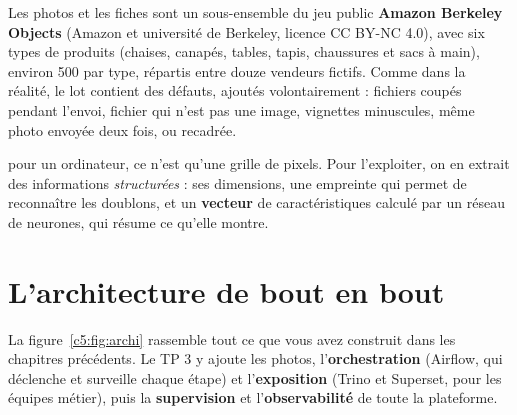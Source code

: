 Les photos et les fiches sont un sous-ensemble du jeu public \textbf{Amazon Berkeley Objects}
(Amazon et université de Berkeley, licence CC BY-NC 4.0), avec six types de produits (chaises,
canapés, tables, tapis, chaussures et sacs à main), environ 500 par type, répartis entre douze
vendeurs fictifs. Comme dans la
réalité, le lot contient des défauts, ajoutés volontairement : fichiers coupés pendant l'envoi,
fichier qui n'est pas une image, vignettes minuscules, même photo envoyée deux fois, ou recadrée.

\begin{notion}
pour un ordinateur, ce n'est qu'une grille de
pixels. Pour l'exploiter, on en extrait des informations \emph{structurées} : ses dimensions, une
empreinte qui permet de reconnaître les doublons, et un \textbf{vecteur} de caractéristiques
calculé par un réseau de neurones, qui résume ce qu'elle montre.
\end{notion}

\section{L'architecture de bout en bout}

La figure~\ref{c5:fig:archi} rassemble tout ce que vous avez construit dans les chapitres précédents. Le TP 3 y
ajoute les photos, l'\textbf{orchestration} (Airflow, qui déclenche et surveille chaque étape) et
l'\textbf{exposition} (Trino et Superset, pour les équipes métier), puis la \textbf{supervision} et
l'\textbf{observabilité} de toute la plateforme.

